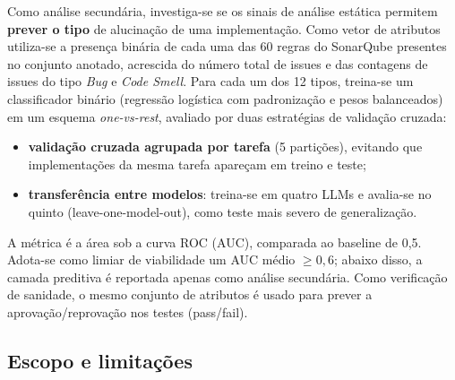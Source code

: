 Como análise secundária, investiga-se se os sinais de análise estática permitem \textbf{prever o tipo} de alucinação de uma implementação. Como vetor de atributos utiliza-se a presença binária de cada uma das 60 regras do SonarQube presentes no conjunto anotado, acrescida do número total de issues e das contagens de issues do tipo \textit{Bug} e \textit{Code Smell}. Para cada um dos 12 tipos, treina-se um classificador binário (regressão logística com padronização e pesos balanceados) em um esquema \textit{one-vs-rest}, avaliado por duas estratégias de validação cruzada:
\begin{itemize}
    \item \textbf{validação cruzada agrupada por tarefa} (5 partições), evitando que implementações da mesma tarefa apareçam em treino e teste;
    \item \textbf{transferência entre modelos}: treina-se em quatro LLMs e avalia-se no quinto (leave-one-model-out), como teste mais severo de generalização.
\end{itemize}
A métrica é a área sob a curva ROC (AUC), comparada ao baseline de 0,5. Adota-se como limiar de viabilidade um AUC médio $\ge 0{,}6$; abaixo disso, a camada preditiva é reportada apenas como análise secundária. Como verificação de sanidade, o mesmo conjunto de atributos é usado para prever a aprovação/reprovação nos testes (pass/fail).

\subsection{Escopo e limitações}
\label{sec:limitacoes-silenciosas}

